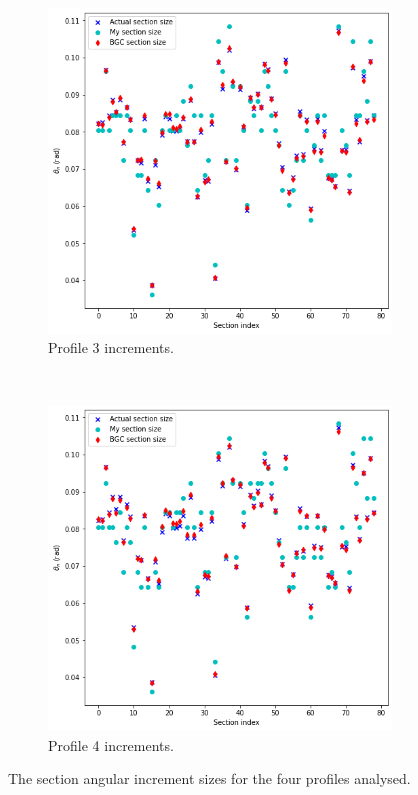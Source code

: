 \documentclass{article}
\begin{document}
\begin{figure}[htb!]
		\begin{subfigure}[b]{0.45\textwidth}
			\centering
			\includegraphics[width=\textwidth]{Q4_f3_4.png}
			\caption{Profile 3 increments.}
		\end{subfigure}
		~
		\begin{subfigure}[b]{0.45\textwidth}
			\centering
			\includegraphics[width=\textwidth]{Q4_f4_4.png}
			\caption{Profile 4 increments.}
		\end{subfigure}
		
		\caption{The section angular increment sizes for the four profiles analysed.}
		\label{fig:Q4_sections}
	\end{figure}
\end{document}
